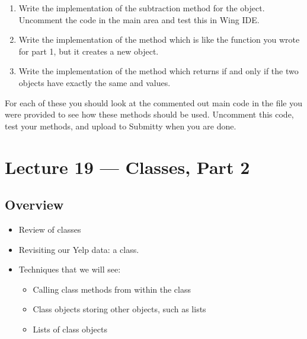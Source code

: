 \documentclass[letterpaper,10pt,english]{sphinxmanual}
\begin{document}
\begin{enumerate}
\begin{enumerate}
\item {} 
Write the implementation of the subtraction method 
for the  object.  Uncomment the code in the main area
and test this in Wing IDE.

\item {} 
Write the implementation of the method  which is
like the  function you wrote for part 1, but it creates
a new  object.

\item {} 
Write the implementation of the method  which
returns  if and only if the two  objects have
exactly the same  and  values.

\end{enumerate}

For each of these you should look at the commented out main code in
the  file you were provided to see how these
methods should be used.  Uncomment this code, test your methods,
and upload to Submitty when you are done.

\end{enumerate}


\chapter{Lecture 19 — Classes, Part 2}
\label{\detokenize{lecture_notes/lec19_classes2:lecture-19-classes-part-2}}\label{\detokenize{lecture_notes/lec19_classes2::doc}}

\section{Overview}
\label{\detokenize{lecture_notes/lec19_classes2:overview}}\begin{itemize}
\item {} 
Review of classes

\item {} 
Revisiting our Yelp data:  a  class.

\item {} 
Techniques that we will see:
\begin{itemize}
\item {} 
Calling class methods from within the class

\item {} 
Class objects storing other objects, such as lists

\item {} 
Lists of class objects

\end{itemize}

\end{itemize}
\end{document}
